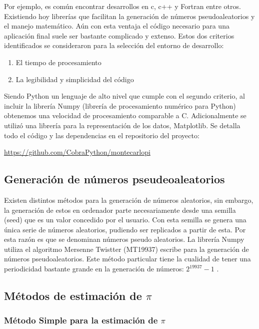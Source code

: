 \documentclass{rbf}
\begin{document}
Por ejemplo, es común encontrar desarrollos en c, c++ y Fortran entre otros. Existiendo hoy librerías que facilitan la generación de números pseudoaleatorios y el manejo matemático. Aún con esta ventaja el código necesario para una aplicación final suele ser bastante complicado y extenso.
Estos dos criterios identificados se consideraron para la selección del entorno de desarrollo:

\begin{enumerate}
    \item El tiempo de procesamiento
    \item La legibilidad y simplicidad del código
\end{enumerate}


Siendo Python un lenguaje de alto nivel que cumple con el segundo criterio, al incluir la librería Numpy (librería de procesamiento numérico para Python) obtenemos una velocidad de procesamiento comparable a C. Adicionalmente se utilizó una librería para la representación de los datos, Matplotlib.
Se detalla todo el código y las dependencias en el repositorio del proyecto:

\url{https://github.com/CobraPython/montecarlopi}

\subsection{Generación de números pseudeoaleatorios}

Existen distintos métodos para la generación de números aleatorios, sin embargo, la generación de estos en ordenador parte necesariamente desde una semilla (seed) que es un valor concedido por el usuario. Con esta semilla se genera una única serie de números aleatorios, pudiendo ser replicados a partir de esta. Por esta razón es que se denominan números pseudo aleatorios.
La librería Numpy utiliza el algoritmo Mersenne Twistter (MT19937) escribe \cite{tan} para la generación de números pseudoaleatorios. Este método particular tiene la cualidad de tener una periodicidad bastante grande en la generación de números: $2^19937-1$ \cite{mako}.

\subsection{Métodos de estimación de $\pi$}
\subsubsection{Método Simple para la estimación de $\pi$}
\end{document}
